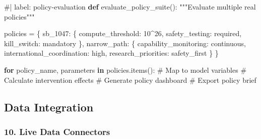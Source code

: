\documentclass[
  11pt,
  letterpaper,
]{book}
\newenvironment{Shaded}{\begin{snugshade}}{\end{snugshade}}
\newcommand{\CommentTok}[1]{\textcolor[rgb]{0.37,0.37,0.37}{#1}}
\newcommand{\ControlFlowTok}[1]{\textcolor[rgb]{0.00,0.23,0.31}{\textbf{#1}}}
\newcommand{\DecValTok}[1]{\textcolor[rgb]{0.68,0.00,0.00}{#1}}
\newcommand{\KeywordTok}[1]{\textcolor[rgb]{0.00,0.23,0.31}{\textbf{#1}}}
\newcommand{\NormalTok}[1]{\textcolor[rgb]{0.00,0.23,0.31}{#1}}
\newcommand{\OperatorTok}[1]{\textcolor[rgb]{0.37,0.37,0.37}{#1}}
\newcommand{\StringTok}[1]{\textcolor[rgb]{0.13,0.47,0.30}{#1}}
\begin{document}
\begin{Shaded}
\begin{Highlighting}[]
\CommentTok{\#| label: policy{-}evaluation}
\KeywordTok{def}\NormalTok{ evaluate\_policy\_suite():}
    \CommentTok{"""Evaluate multiple real policies"""}
    
\NormalTok{    policies }\OperatorTok{=}\NormalTok{ \{}
        \StringTok{\textquotesingle{}sb\_1047\textquotesingle{}}\NormalTok{: \{}
            \StringTok{\textquotesingle{}compute\_threshold\textquotesingle{}}\NormalTok{: }\DecValTok{10}\OperatorTok{\^{}}\DecValTok{26}\NormalTok{,}
            \StringTok{\textquotesingle{}safety\_testing\textquotesingle{}}\NormalTok{: }\StringTok{\textquotesingle{}required\textquotesingle{}}\NormalTok{,}
            \StringTok{\textquotesingle{}kill\_switch\textquotesingle{}}\NormalTok{: }\StringTok{\textquotesingle{}mandatory\textquotesingle{}}
\NormalTok{        \},}
        \StringTok{\textquotesingle{}narrow\_path\textquotesingle{}}\NormalTok{: \{}
            \StringTok{\textquotesingle{}capability\_monitoring\textquotesingle{}}\NormalTok{: }\StringTok{\textquotesingle{}continuous\textquotesingle{}}\NormalTok{,}
            \StringTok{\textquotesingle{}international\_coordination\textquotesingle{}}\NormalTok{: }\StringTok{\textquotesingle{}high\textquotesingle{}}\NormalTok{,}
            \StringTok{\textquotesingle{}research\_priorities\textquotesingle{}}\NormalTok{: }\StringTok{\textquotesingle{}safety\_first\textquotesingle{}}
\NormalTok{        \}}
\NormalTok{    \}}
    
    \ControlFlowTok{for}\NormalTok{ policy\_name, parameters }\KeywordTok{in}\NormalTok{ policies.items():}
        \CommentTok{\# Map to model variables}
        \CommentTok{\# Calculate intervention effects}
        \CommentTok{\# Generate policy dashboard}
        \CommentTok{\# Export policy brief}
\end{Highlighting}
\end{Shaded}

\subsection{Data Integration}\label{data-integration}

\subsubsection{10. Live Data Connectors}\label{live-data-connectors}
\end{document}

